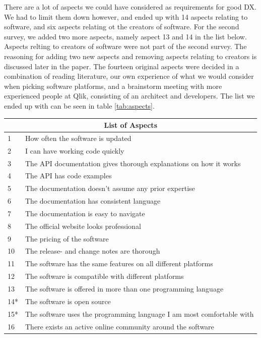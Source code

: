 \documentclass{article}
\begin{document}
There are a lot of aspects we could have considered as requirements for
good DX. We had to limit them down however, and ended up with 14 aspects relating to software, and six aspects relating ot the
creators of software.
For the second survey, we added two more aspects, namely aspect 13 and 14 in the list below. Aspects relting to
creators of software were not part of the second survey.
The reasoning for adding two new aspects and removing aspects relating to creators is
discussed later in the paper. The fourteen original aspects were decided in a combination
of reading literature, our own experience of what we would consider when
picking software platforms, and a brainstorm meeting with more experienced
people at Qlik, consisting of an architect and developers.
The list we ended up with can be seen in table \ref{tab:aspects}.
\begin{table}[H]
\centering
\begin{tabularx}{\columnwidth}{l X}
\multicolumn{2}{c}{\textbf{List of Aspects}} \\
\hline
1    & How often the software is updated    \\
2    & I can have working code quickly  \\
3    & The API documentation gives thorough explanations on how it works    \\
4    & The API has code examples    \\
5    & The documentation doesn't assume any prior expertise \\
6    & The documentation has consistent language    \\
7    & The documentation is easy to navigate    \\
8    & The official website looks professional  \\
9    & The pricing of the software  \\
10    &  The release- and change notes are thorough \\
11   &  The software has the same features on all different platforms   \\
12    &  The software is compatible with different platforms    \\
13  &  The software is offered in more than one programming language    \\
14*    &  The software is open source    \\
15*    &  The software uses the programming language I am most comfortable with  \\
16    &  There exists an active online community around the software    \\

\end{tabularx}
\end{table}
\end{document}
